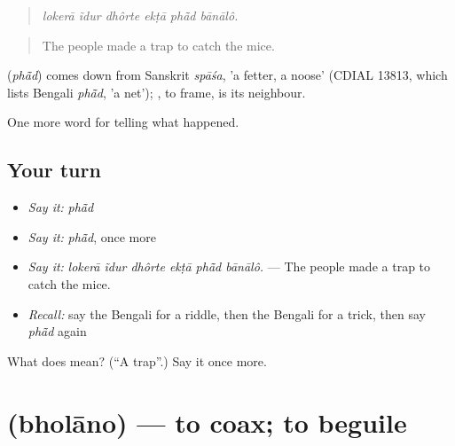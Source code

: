 \begin{quote}
     
\end{quote}

\begin{quote}
\emph{lokerā ĩdur dhôrte ekṭā phā̃d bānālô.}
\end{quote}

\begin{quote}
The people made a trap to catch the mice.
\end{quote}

\begin{cousinweb}
\textbf{} (\emph{phā̃d}) comes down from Sanskrit \emph{spāśa}, 'a fetter, a noose' (CDIAL 13813, which lists Bengali \emph{phā̃d}, 'a net'); \textbf{}, to frame, is its neighbour.
\end{cousinweb}

\begin{grammarlens}[title={What you've built}]
One more word for telling what happened.
\end{grammarlens}

\subsection*{Your turn}
\begin{itemize}
\raggedright
  \item \emph{Say it:} \emph{phā̃d}
  \item \emph{Say it:} \emph{phā̃d}, once more
  \item \emph{Say it:} \emph{lokerā ĩdur dhôrte ekṭā phā̃d bānālô.} — The people made a trap to catch the mice.
  \item \emph{Recall:} say the Bengali for a riddle, then the Bengali for a trick, then say \emph{phā̃d} again
\end{itemize}

\begin{tcolorbox}[breakable,colback=teal!4,colframe=teal!35!black,title={Before you move on}]
What does  mean? (\textquotedblleft{}A trap\textquotedblright{}.) Say it once more.
\end{tcolorbox}
\section[\texorpdfstring{\bn{ভোলানো} (bholāno)}{ভোলানো (bholāno)}]{ (bholāno) — to coax; to beguile}

\label{lesson:BN-C324-bholano}



